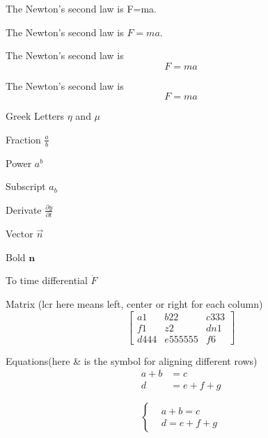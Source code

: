 \documentclass{article}
\begin{document}
The Newton's second law is F=ma.

The Newton's second law is $F=ma$.

The Newton's second law is
$$F=ma$$

The Newton's second law is
\[F=ma\]

Greek Letters $\eta$ and $\mu$

Fraction $\frac{a}{b}$

Power $a^b$

Subscript $a_b$

Derivate $\frac{\partial y}{\partial t} $

Vector $\vec{n}$

Bold $\mathbf{n}$

To time differential $\dot{F}$

Matrix (lcr here means left, center or right for each column)
\[
\left[
\begin{array}{lcr}
a1 & b22 & c333 \\
f1 & z2 & dn1 \\
d444 & e555555 & f6
\end{array}
\right]
\]

Equations(here \& is the symbol for aligning different rows)
\begin{align}
a+b&=c\\
d&=e+f+g
\end{align}

\[
\left\{
\begin{aligned}
&a+b=c\\
&d=e+f+g
\end{aligned}
\right.
\]
\end{document}
